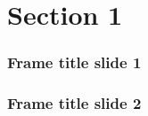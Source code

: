
\section{Section 1} %


\begin{frame}
	\frametitle{Frame title slide 1}
	
	
\end{frame}


\begin{frame}
	\frametitle{Frame title slide 2}

        
\end{frame}



